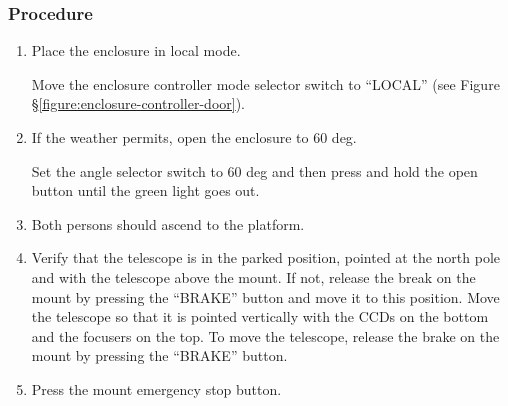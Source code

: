 \subsubsection{Procedure}

\begin{enumerate}

\item
Place the enclosure in local mode.

Move the enclosure controller mode selector switch to “LOCAL” (see Figure \S\ref{figure:enclosure-controller-door}).
\item
If the weather permits, open the enclosure to 60 deg.

Set the angle selector switch to 60 deg and then press and hold the open button until the green light goes out.

\item
Both persons should ascend to the platform.

\item
\ifcoatli
Verify that the telescope is in the parked position, pointed at the north pole and with the telescope above the mount. If not, release the break on the mount by pressing the “BRAKE” button and move it to this position.
\fi
\ifddoti
Move the telescope so that it is pointed vertically with the CCDs on the bottom and the focusers on the top. To move the telescope, release the brake on the mount by pressing the “BRAKE” button.
\fi

\item
Press the mount emergency stop button.


\end{enumerate}
